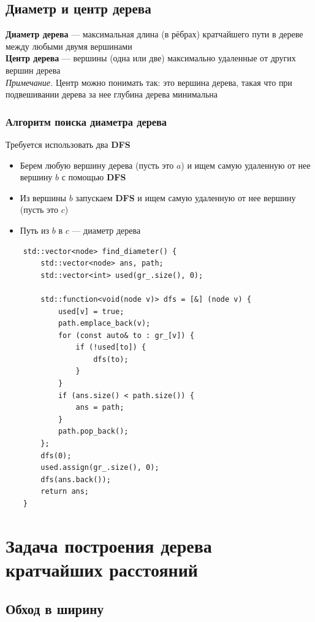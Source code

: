 \documentclass[a4paper]{article}
\newcommand{\dfs}{\textbf{DFS }}
\begin{document}
\subsection{Диаметр и центр дерева}
\textbf{Диаметр дерева} — максимальная длина (в рёбрах) кратчайшего пути в дереве между любыми двумя вершинами\\[2mm]
\indent\textbf{Центр дерева} — вершины (одна или две) максимально удаленные от других вершин дерева\\
\indent\indent\textit{Примечание.} Центр можно понимать так: это вершина дерева, такая что при подвешивании дерева за нее глубина дерева минимальна
\subsubsection*{Алгоритм поиска диаметра дерева}
Требуется использовать два \dfs
\begin{itemize}
    \item Берем любую вершину дерева (пусть это $a$) и ищем самую удаленную от нее вершину $b$ с помощью \dfs
    \item Из вершины $b$ запускаем \dfs и ищем самую удаленную от нее вершину (пусть это $c$)
    \item Путь из $b$ в $c$ — диаметр дерева
\end{itemize}

\begin{lstlisting}
    std::vector<node> find_diameter() {
        std::vector<node> ans, path;
        std::vector<int> used(gr_.size(), 0);

        std::function<void(node v)> dfs = [&] (node v) {
            used[v] = true;
            path.emplace_back(v);
            for (const auto& to : gr_[v]) {
                if (!used[to]) {
                    dfs(to);
                }
            }
            if (ans.size() < path.size()) {
                ans = path;
            }
            path.pop_back();
        };
        dfs(0);
        used.assign(gr_.size(), 0);
        dfs(ans.back());
        return ans;
    }
\end{lstlisting}

\section{Задача построения дерева кратчайших расстояний}
\subsection{Обход в ширину}
\end{document}
